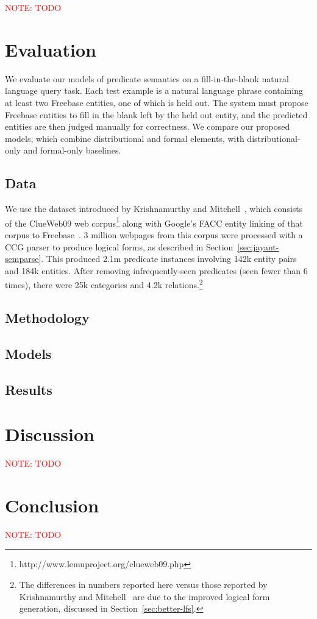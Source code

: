 \documentclass[11pt]{article}
\newcommand{\secref}[1]{Section~\ref{sec:#1}}
\newcommand{\mattnote}[1]{\textcolor{red}{NOTE: #1}}
\begin{document}
\mattnote{TODO}

\section{Evaluation}
\label{sec:evaluation}

We evaluate our models of predicate semantics on a fill-in-the-blank natural
language query task.  Each test example is a natural language phrase containing
at least two Freebase entities, one of which is held out.  The system must
propose Freebase entities to fill in the blank left by the held out entity, and
the predicted entities are then judged manually for correctness.  We compare
our proposed models, which combine distributional and formal elements, with
distributional-only and formal-only baselines.

\subsection{Data}

We use the dataset introduced by Krishnamurthy and
Mitchell~, which
consists of the ClueWeb09 web
corpus\footnote{http://www.lemuproject.org/clueweb09.php} along with Google's
FACC entity linking of that corpus to
Freebase~\cite{gabrilovich-2013-clueweb-entity-linking}.  3 million webpages
from this corpus were processed with a CCG parser to produce logical forms, as
described in \secref{jayant-semparse}.  This produced 2.1m predicate instances
involving 142k entity pairs and 184k entities.  After removing
infrequently-seen predicates (seen fewer than 6 times), there were 25k
categories and 4.2k relations.\footnote{The differences in numbers reported
here versus those reported by Krishnamurthy and
Mitchell~ are due to the
improved logical form generation, discussed in \secref{better-lfs}.}

\subsection{Methodology}

\subsection{Models}

\subsection{Results}

\section{Discussion}
\label{sec:discussion}

\mattnote{TODO}

\section{Conclusion}
\label{sec:conclusion}

\mattnote{TODO}




\end{document}
